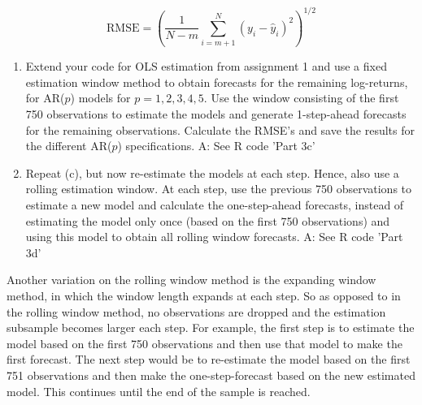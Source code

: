 \documentclass{article}
\begin{document}
$$
\text{RMSE} = \left( \frac{1}{N-m} \sum_{i=m+1}^{N} (y_i - \hat{y}_i)^2 \right)^{1/2}
$$
\begin{enumerate}
    \item [(c)] Extend your code for OLS estimation from assignment 1 and use a fixed estimation window method to obtain forecasts for the remaining log-returns, for AR($p$) models for $p= 1,2,3,4,5$. Use the window consisting of the first 750 observations to estimate the models and generate 1-step-ahead forecasts for the remaining observations. Calculate the RMSE’s and save the results for the different AR($p$) specifications. \newline \newline
    A: See R code 'Part 3c'
    
    \item[(d)] Repeat (c), but now re-estimate the models at each step. Hence, also use a rolling estimation window. At each step, use the previous 750 observations to estimate a new model and calculate the one-step-ahead forecasts, instead of estimating the model only once (based on the first 750 observations) and using this model to obtain all rolling window forecasts. \newline \newline
    A: See R code 'Part 3d'
\end{enumerate}
Another variation on the rolling window method is the expanding window method, in which the window length expands at each step. So as opposed to in the rolling window method, no observations are dropped and the estimation subsample becomes larger each step. For example, the first step is to estimate the model based on the first 750 observations and then use that model to make the first forecast. The next step would be to re-estimate the model based on the first 751 observations and then make the one-step-forecast based on the new estimated model. This continues until the end of the sample is reached.
\end{document}
